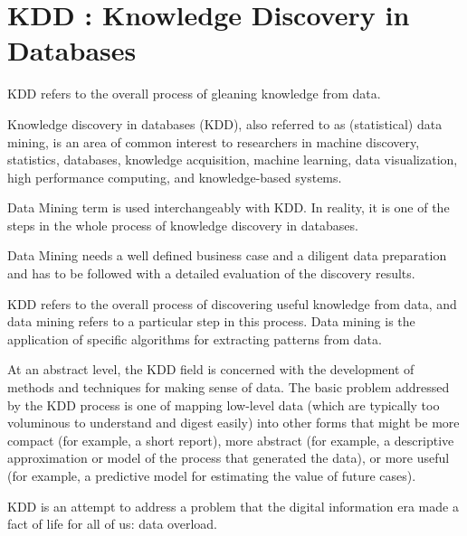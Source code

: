 \section{KDD : Knowledge Discovery in Databases}

KDD refers to the overall process of gleaning knowledge from data.


Knowledge discovery in databases (KDD), also referred to as (statistical) data mining, is an area of common interest to researchers in machine discovery, statistics, databases, knowledge acquisition, machine learning, data visualization, high performance computing, and knowledge-based systems.


Data Mining term is used interchangeably with KDD. In reality, it is one of the steps in the whole process of knowledge discovery in databases.


Data Mining needs a well defined business case and a diligent data preparation and has to be followed with a detailed evaluation of the discovery results.


KDD refers to the overall process of discovering useful knowledge from data, and data mining refers to a particular step in this process. Data mining is the application of specific algorithms for extracting patterns from data.


At an abstract level, the KDD field is concerned with the development of methods and techniques for making sense of data. The basic problem addressed by the KDD process is one of mapping low-level data (which are typically too voluminous to understand and digest easily) into other forms that might be more compact (for example, a short report), more abstract (for example, a descriptive approximation or model of the process that generated the data), or more useful (for example, a predictive model for estimating the value of future cases).


KDD is an attempt to address a problem that the digital information era made a fact of life for all of us: data overload.


